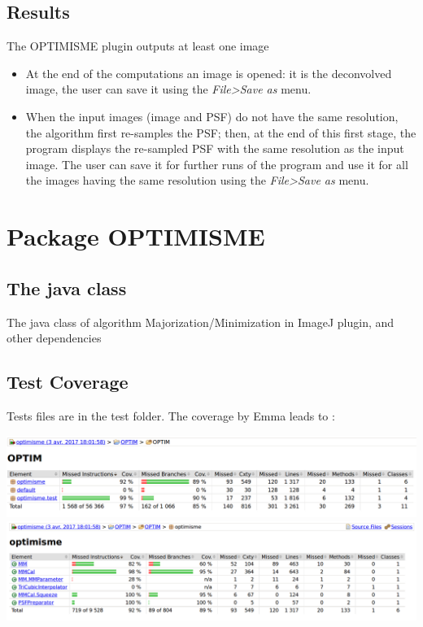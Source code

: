 \documentclass[12pt, a4paper]{scrartcl}
\begin{document}
\subsection{Results}

The OPTIMISME plugin outputs at least one image
\begin{itemize}

\item At the end of the computations an image is opened: it is the deconvolved image, the user can save it using the \emph{File>Save as}  menu.
\item When the input images (image and PSF) do not have the same resolution, the algorithm first re-samples the PSF; then, at the end of this first stage, the program displays the re-sampled PSF with the same resolution as the input image. The user can save it for further runs of the program and use it for all the images having the same resolution  using the \emph{File>Save as} menu.
\end{itemize}

\section{Package OPTIMISME}

\subsection{The java class}
The java class of algorithm Majorization/Minimization
in ImageJ plugin, and other dependencies
\subsection{Test Coverage}
Tests files are in the test folder. The coverage by Emma leads to :

\begin{center}
\includegraphics[scale=0.28]{images/coverage1.png}
\includegraphics[scale=0.28]{images/coverage.png}
\end{center}
\end{document}
